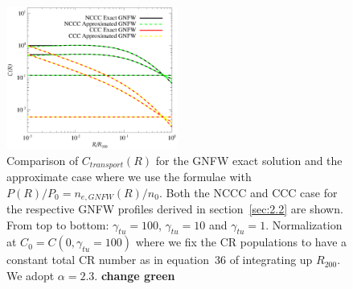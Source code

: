 \documentclass[traditabstract]{aa}
\begin{document}
\begin{appendix}
\begin{figure}[hbt!]
\centering
\includegraphics[width=0.5\textwidth]{figures/CR_profiles_REXexactVSfake.eps}
\caption{Comparison of $C_{transport}(R)$ for the GNFW exact solution and the approximate case where we use the \cite{2011A&A...527A..99E} formulae with $P(R)/P_{0}=n_{e,GNFW}(R)/n_{0}$. Both the NCCC and CCC case for the respective GNFW profiles derived in section~\ref{sec:2.2} are shown. From top to bottom: $\gamma_{tu}=100$, $\gamma_{tu}=10$ and $\gamma_{tu}=1$. Normalization at $C_{0}=C(0,\gamma_{tu}=100)$ where we fix the CR populations to have a constant total CR number as in equation~36 of \cite{2011A&A...527A..99E} integrating up $R_{200}$. We adopt $\alpha=2.3$. {\bf change green}}
\label{fig:REXexactVSfake}
\end{figure}

\end{appendix}
\end{document}
